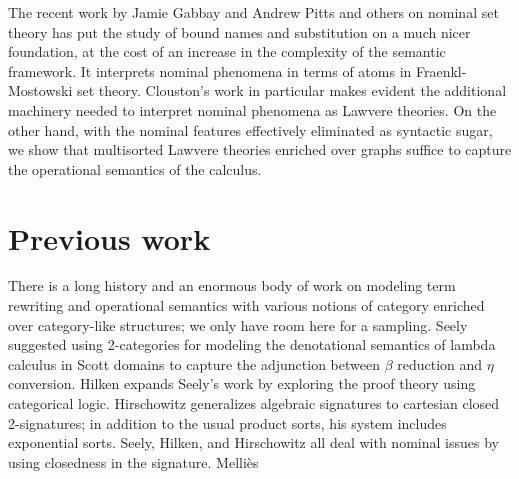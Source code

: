 \documentclass[a4paper,UKenglish]{lipics-v2016}
\begin{document}
The recent work by Jamie Gabbay and Andrew Pitts
\cite{DBLP:journals/fac/GabbayP02} and others
\cite{DBLP:journals/jcss/Clouston14} on nominal set theory has put the
study of bound names and substitution on a much nicer foundation, at
the cost of an increase in the complexity of the semantic
framework. It interprets nominal phenomena in terms of atoms in
Fraenkl-Mostowski set theory. Clouston's work in particular makes
evident the additional machinery needed to interpret nominal phenomena
as Lawvere theories. On the other hand, with the nominal features
effectively eliminated as syntactic sugar, we show that multisorted
Lawvere theories enriched over graphs suffice to capture the
operational semantics of the calculus.

\section{Previous work}
There is a long history and an enormous body of work on modeling term rewriting and operational semantics with various notions of category enriched over category-like structures; we only have room here for a sampling.  Seely \cite{Seely} 
suggested using 2-categories for modeling the denotational semantics of lambda calculus in Scott domains to capture the adjunction between $\beta$ reduction and $\eta$ conversion.  Hilken \cite{hilken}
expands Seely's work by exploring the proof theory using categorical logic.  Hirschowitz \cite{Hirschowitz}
generalizes algebraic signatures to cartesian closed 2-signatures; in addition to the usual product sorts, his system includes exponential sorts.  Seely, Hilken, and Hirschowitz all deal with nominal issues by using closedness in the signature.
Melli\`es
\end{document}
